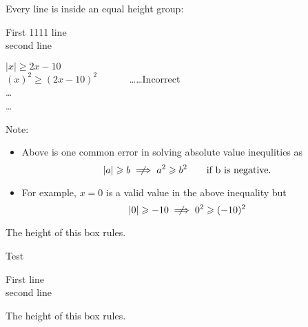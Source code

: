 \noindent 
Every line is inside an equal height group:
\begin{tcbraster}[raster equal height,
                  raster column skip=-1pt,
                  title=Box \thetcbrasternum,
                  enhanced,
                  size=small,
                  styexample]
\begin{tcolorbox}First 1111 line\\second line\\


\begin{warningEnv}
     $ \lvert x \rvert \geqslant 2x-10 $ \\
     $ (x)^2 \geqslant (2x-10)^2 \quad \quad \quad $ \dots \dots Incorrect \\
     \dots \\
     \dots     
\end{warningEnv}



Note:
\begin{itemize}
       \item[] Above is one common error in solving absolute value inequlities as 
                \[    \lvert a \rvert \geqslant b       \centernot\implies     a^2 \geqslant b^2  \quad  \quad \text{if b is negative.} \]    
    
      \item[]  For example, $x=0$ is a valid value in the above inequality but
                \[     \lvert 0 \rvert \geqslant -10       \centernot\implies     0^2 \geqslant (-10)^2 \] 
\end{itemize}





The height of this box rules.\end{tcolorbox}
\begin{tcolorbox}Test\end{tcolorbox}
\begin{tcolorbox}
First line\\second line\end{tcolorbox}
\begin{tcolorbox}The height of this box rules.\end{tcolorbox}
\end{tcbraster}






